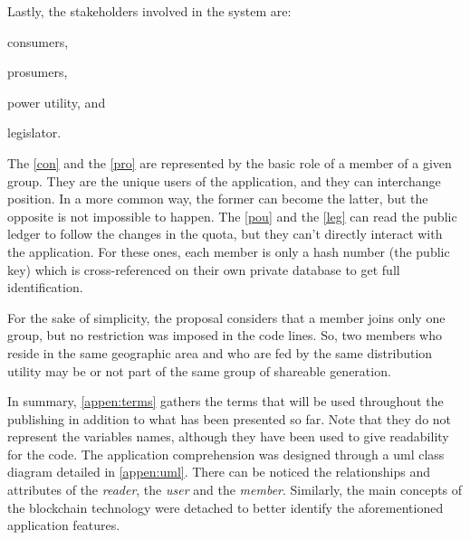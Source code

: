 Lastly, the stakeholders involved in the system are:
\begin{enumerate*}[label={(\roman*)}]
    \item\label{con} consumers,
    \item\label{pro} prosumers,
    \item\label{pou} power utility, and
    \item\label{leg} legislator.
\end{enumerate*}
The \ref{con} and the \ref{pro} are represented by the basic role of a member of a given group.
They are the unique users of the application, and they can interchange position.
In a more common way, the former can become the latter, but the opposite is not impossible to happen.
The \ref{pou} and the \ref{leg} can read the public ledger to follow the changes in the quota, but they can't directly interact with the application.
For these ones, each member is only a hash number (the public key) which is cross-referenced on their own private database to get full identification.

For the sake of simplicity, the proposal considers that a member joins only one group, but no restriction was imposed in the code lines.
So, two members who reside in the same geographic area and who are fed by the same distribution utility may be or not part of the same group of shareable generation.

In summary, \autoref{appen:terms} gathers the terms that will be used throughout the publishing in addition to what has been presented so far.
Note that they do not represent the variables names, although they have been used to give readability for the code.
The application comprehension was designed through a \gls{uml} class diagram detailed in \autoref{appen:uml}.
There can be noticed the relationships and attributes of the \emph{reader}, the \emph{user} and the \emph{member}.
Similarly, the main concepts of the blockchain technology were detached to better identify the aforementioned application features.


